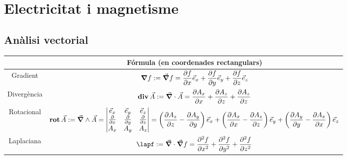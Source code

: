 \documentclass[../../../main.tex]{subfiles}
\begin{document}
\section{Electricitat i magnetisme}
\subsection{Anàlisi vectorial}
\begin{center}
    \begin{tabular}{|c|c|}

        \hline
                    & Fórmula (en coordenades rectangulars)                                                                                                                                                                                                                                                                                                             \\
        \hline
        Gradient    & $\displaystyle\grad f:=\Vec{\grad}f=\frac{\partial f}{\partial x}\Vec{e}_x+\frac{\partial f}{\partial y}\Vec{e}_y+\frac{\partial f}{\partial z}\Vec{e}_z$                                                                                                                                                                                         \\
        \hline
        Divergència & $\displaystyle\operatorname{\vb{div}} \Vec{A}:=\Vec{\grad}\cdot\Vec{A}=\frac{\partial A_x}{\partial x}+\frac{\partial A_z}{\partial z}+\frac{\partial A_z}{\partial z}$                                                                                                                                                                                              \\
        \hline
        Rotacional  & $\displaystyle\operatorname{\vb{rot}} \Vec{A}:=\Vec{\grad}\wedge\Vec{A}=\begin{vmatrix}
                \Vec{e}_x                   & \Vec{e}_y                   & \Vec{e}_z                   \\
                \frac{\partial}{\partial x} & \frac{\partial}{\partial y} & \frac{\partial}{\partial z} \\
                A_x                         & A_y                         & A_z                         \\
            \end{vmatrix}=\left(\frac{\partial A_z}{\partial z}-\frac{\partial A_y}{\partial y}\right)\Vec{e}_x+\left(\frac{\partial A_x}{\partial x}-\frac{\partial A_z}{\partial z}\right)\Vec{e}_y+\left(\frac{\partial A_y}{\partial y}-\frac{\partial A_x}{\partial x}\right)\Vec{e}_z$ \\
        \hline
        Laplaciana  & $\displaystyle\lapf:=\Vec{\grad}\cdot\Vec{\grad}f=\frac{\partial^2f}{\partial x^2}+\frac{\partial^2f}{\partial y^2}+\frac{\partial^2f}{\partial z^2}$                                                                                                                                                                                             \\
        \hline
    \end{tabular}
\end{center}
\end{document}
